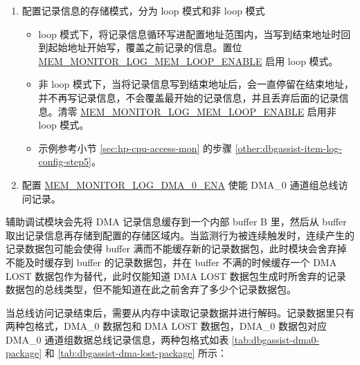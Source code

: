 \documentclass[main\_\_CN.tex]{subfiles}
\begin{document}
\begin{enumerate}
\begin{itemize}
            \item 置位 \hyperref[regdesc:MEMMONITORLOGMEMADDRUPDATEREG]{MEM\_MONITOR\_LOG\_MEM\_ADDR\_UPDATE\_REG}，使 \hyperref[regdesc:MEMMONITORLOGMEMCURRENTADDRREG]{MEM\_MONITOR\_LOG\_MEM\_CURRENT\_ADDR\_REG} 更新为 \hyperref[regdesc:MEMMONITORLOGMEMSTARTREG]{MEM\_MONITOR\_LOG\_MEM\_START\_REG}。
            \item 配置辅助调试模块对 HP SRAM 的使用权限，只有开启了辅助调试模块对 HP SRAM 的使用权限才能访问 HP SRAM。关于如何配置，详情见章节 \ref{mod:permctrl} \textit{}。
        \end{itemize}
    \item 配置记录信息的存储模式，分为 loop 模式和非 loop 模式
        \begin{itemize}
            \item loop 模式下，将记录信息循环写进配置地址范围内，当写到结束地址时回到起始地址开始写，覆盖之前记录的信息。置位 \hyperref[fielddesc:MEMMONITORLOGMEMLOOPENABLE]{MEM\_MONITOR\_LOG\_MEM\_LOOP\_ENABLE} 启用 loop 模式。
            \item 非 loop 模式下，当将记录信息写到结束地址后，会一直停留在结束地址，并不再写记录信息，不会覆盖最开始的记录信息，并且丢弃后面的记录信息。清零 \hyperref[fielddesc:MEMMONITORLOGMEMLOOPENABLE]{MEM\_MONITOR\_LOG\_MEM\_LOOP\_ENABLE} 启用非 loop 模式。\\
            \item 示例参考小节 \ref{sec:hp-cpu-access-mon} 的步骤 \ref{other:dbgassist-item-log-config-step5}。
        \end{itemize}
    \item 配置 \hyperref[fielddesc:MEMMONITORLOGDMA0ENA]{MEM\_MONITOR\_LOG\_DMA\_0\_ENA} 使能 DMA\_0 通道组总线访问记录。
\end{enumerate}

辅助调试模块会先将 DMA 记录信息缓存到一个内部 buffer B 里，然后从 buffer 取出记录信息再存储到配置的存储区域内。当监测行为被连续触发时，连续产生的记录数据包可能会使得 buffer 满而不能缓存新的记录数据包，此时模块会舍弃掉不能及时缓存到 buffer 的记录数据包，并在 buffer 不满的时候缓存一个 DMA LOST 数据包作为替代，此时仅能知道 DMA LOST 数据包生成时所舍弃的记录数据包的总线类型，但不能知道在此之前舍弃了多少个记录数据包。

当总线访问记录结束后，需要从内存中读取记录数据并进行解码。记录数据里只有两种包格式，DMA\_0 数据包和 DMA LOST 数据包，DMA\_0 数据包对应 DMA\_0 通道组数据总线记录信息，两种包格式如表 \ref{tab:dbgassist-dma0-package} 和 \ref{tab:dbgassist-dma-lost-package} 所示：
    
\end{document}
